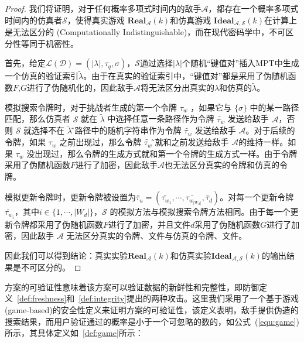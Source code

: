 \begin{proof}
  我们将证明，对于任何概率多项式时间内的敌手$\mathcal{A}$，都存在一个概率多项式时间内的仿真者$\mathcal{S}$，使得真实游戏 $\mathbf{Real}_\mathcal{A}(k)$和仿真游戏 $\mathbf{Ideal}_\mathcal{A,S}(k)$在计算上是无法区分的 (Computationally Indistinguishable)，而在现代密码学中，不可区分性等同于机密性。

  首先，给定$\mathcal{L}(\mathcal{D})=(|\lambda|,{\tau}_q,{\sigma})$，$\mathcal{S}$通过选择$|\lambda|$个随机“键值对”插入MPT中生成一个仿真的验证索引$\tilde{\lambda}$。由于在真实的验证索引中，“键值对”都是采用了伪随机函数$F$,$G$进行了伪随机化的，因此敌手$\mathcal{A}$将无法区分出真实的$\lambda$和仿真的$\tilde{\lambda}$。

  模拟搜索令牌时，对于挑战者生成的第一个令牌 $\tau_w$ ，如果它与 $\{\sigma\}$ 中的某一路径匹配，那么仿真者 $\mathcal{S}$ 就在 $\tilde{\lambda}$ 中选择任意一条路径作为令牌 $\tilde{\tau_w}$ 发送给敌手 $\mathcal{A}$，否则 $\mathcal{S}$ 就选择不在 $\tilde{\lambda}$ ̃路径中的随机字符串作为令牌 $\tilde{\tau_w}$ 发送给敌手 $\mathcal{A}$。对于后续的令牌，如果 $\tau_w$ 之前出现过，那么令牌 $\tilde{\tau_w}$ ̃就和之前发送给敌手 $\mathcal{A}$的维持一样。如果 $\tau_w$ 没出现过，那么令牌的生成方式就和第一个令牌的生成方式一样。由于令牌采用了伪随机函数$F$进行了加密，因此敌手$\mathcal{A}$也无法区分真实的令牌和仿真的令牌。

  模拟更新令牌时，更新令牌被设置为$\tilde{\tau_u} = (\tilde{\tau_{w_1}},\cdots,\tilde{\tau_{w_{|W_d|}}},\tilde{\tau_d})$。对每一个更新令牌$\tilde{\tau_{w_i}}$，其中$i \in \{1,\cdots, |W_d|\}$，$\mathcal{S}$ 的模拟方法与模拟搜索令牌方法相同。由于每一个更新令牌都采用了伪随机函数$F$进行了加密，并且文件$d$采用了伪随机函数$G$进行了加密，因此敌手 $\mathcal{A}$ 无法区分真实的令牌、文件与仿真的令牌、文件。

  因此我们可以得到结论：真实实验$\mathbf{Real}_\mathcal{A}(k)$和仿真实验$\mathbf{Ideal}_\mathcal{A,S}(k)$的输出结果是不可区分的。
\end{proof}

\single 方案的可验证性意味着该方案可以验证数据的新鲜性和完整性，即防御定义~\ref{def:freshness}和~\ref{def:integrity}提出的两种攻击。这里我们采用了一个基于游戏 (game-based)的安全性定义来证明\single 方案的可验证性，该定义表明，敌手提供伪造的搜索结果，而用户验证通过的概率是小于一个可忽略的数的，如公式~(\ref{equ:game})所示，其具体定义如~\ref{def:game}所示：

